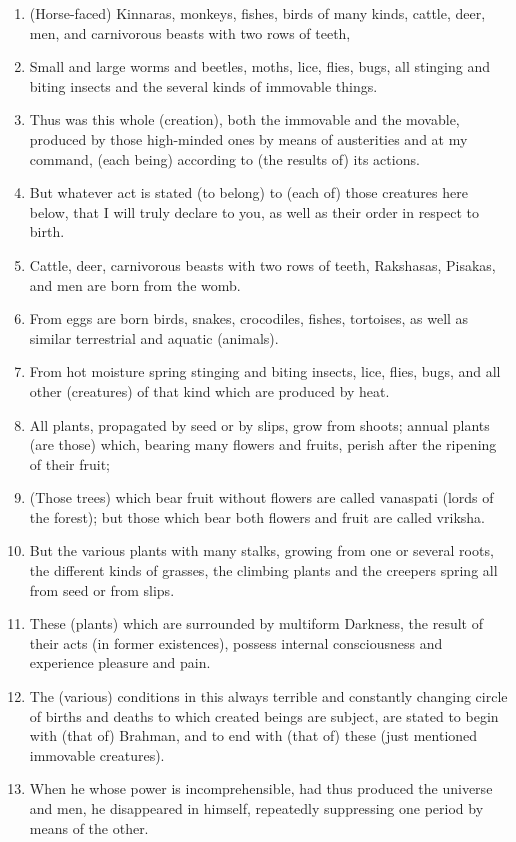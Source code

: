 \begin{enumerate}
\item (Horse-faced) Kinnaras, monkeys, fishes, birds of many kinds, cattle, deer, men, and carnivorous beasts with two rows of teeth,
\item Small and large worms and beetles, moths, lice, flies, bugs, all stinging and biting insects and the several kinds of immovable things.
\item Thus was this whole (creation), both the immovable and the movable, produced by those high-minded ones by means of austerities and at my command, (each being) according to (the results of) its actions.
\item But whatever act is stated (to belong) to (each of) those creatures here below, that I will truly declare to you, as well as their order in respect to birth.
\item Cattle, deer, carnivorous beasts with two rows of teeth, Rakshasas, Pisakas, and men are born from the womb.
\item From eggs are born birds, snakes, crocodiles, fishes, tortoises, as well as similar terrestrial and aquatic (animals).
\item From hot moisture spring stinging and biting insects, lice, flies, bugs, and all other (creatures) of that kind which are produced by heat.
\item All plants, propagated by seed or by slips, grow from shoots; annual plants (are those) which, bearing many flowers and fruits, perish after the ripening of their fruit;
\item (Those trees) which bear fruit without flowers are called vanaspati (lords of the forest); but those which bear both flowers and fruit are called vriksha.
\item But the various plants with many stalks, growing from one or several roots, the different kinds of grasses, the climbing plants and the creepers spring all from seed or from slips.
\item These (plants) which are surrounded by multiform Darkness, the result of their acts (in former existences), possess internal consciousness and experience pleasure and pain.
\item The (various) conditions in this always terrible and constantly changing circle of births and deaths to which created beings are subject, are stated to begin with (that of) Brahman, and to end with (that of) these (just mentioned immovable creatures).
\item When he whose power is incomprehensible, had thus produced the universe and men, he disappeared in himself, repeatedly suppressing one period by means of the other.

\end{enumerate}
